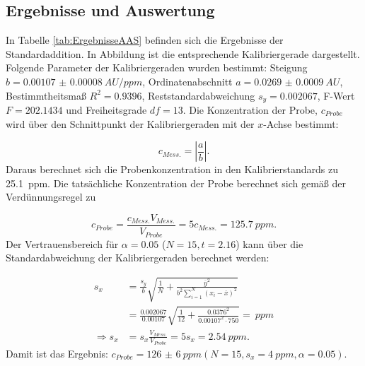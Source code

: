 \subsection{Ergebnisse und Auswertung}
  
  In Tabelle \ref{tab:ErgebnisseAAS} befinden sich die Ergebnisse der Standardaddition. In Abbildung ist die entsprechende Kalibriergerade dargestellt. Folgende Parameter der Kalibriergeraden wurden bestimmt: Steigung $b = \SI[mode=text,separate-uncertainty]{0.00107(8)}{AU\per ppm}$, Ordinatenabschnitt $a = \SI[mode=text, separate-uncertainty]{0.0269(9)}{AU}$, Bestimmtheitsmaß $R^2 = 0.9396$, Reststandardabweichung $s_y = 0.002067$, F-Wert $F = 202.1434$ und Freiheitsgrade $df = 13$. Die Konzentration der Probe, $c_{Probe}$ wird über den Schnittpunkt der Kalibriergeraden mit der $x$-Achse bestimmt:
  
    \begin{equation}
      c_{Mess.} = |\frac{a}{b}|.
    \end{equation}
  Daraus berechnet sich die Probenkonzentration in den Kalibrierstandards zu \SI[mode=text]{25.1}{ppm}. Die tatsächliche Konzentration der Probe berechnet sich gemäß der Verdünnungsregel zu
  
    \begin{equation}
      c_{Probe} = \frac{c_{Mess.} V_{Mess.}}{V_{Probe}} = 5 c_{Mess.} = \SI[mode=text]{125.7}{ppm}.
    \end{equation}
  Der Vertrauensbereich für $\alpha = 0.05$ ($N = 15, t = 2.16$) kann über die Standardabweichung der Kalibriergeraden berechnet werden:
  
    \begin{equation}
      \begin{split}
        s_x &= \frac{s_y}{b} \sqrt{\frac{1}{N} + \frac{\overline{y}^2}{b^2 \sum_{i=1}^N \left(x_i - \overline{x}\right)^2}} \\
            &= \frac{0.002067}{0.00107} \sqrt{\frac{1}{12} + \frac{0.0376^2}{0.00107^2 \cdot 750}} = \SI[mode=text]{}{ppm} \\
   \Rightarrow s_x &= s_x \frac{V_{Mess.}}{V_{Probe}} = 5 s_x = \SI[mode=text]{2.54}{ppm}.
      \end{split}
    \end{equation}
  Damit ist das Ergebnis: $c_{Probe} = \SI[mode=text, multi-part-units = brackets, separate-uncertainty]{126(6)}{ppm} \left(N = 15, s_x = \SI[mode=text]{4}{ppm}, \alpha = 0.05\right)$.
  
